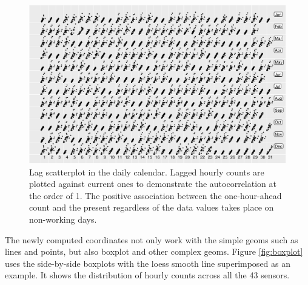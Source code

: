 \documentclass[article]{jss}
\begin{document}
\begin{CodeChunk}
\begin{figure}

{\centering \includegraphics[width=\textwidth]{figure/scatterplot-1} 

}

\caption[Lag scatterplot in the daily calendar]{Lag scatterplot in the daily calendar. Lagged hourly counts are plotted against current ones to demonstrate the autocorrelation at the order of 1. The positive association between the one-hour-ahead count and the present regardless of the data values takes place on non-working days.}\label{fig:scatterplot}
\end{figure}
\end{CodeChunk}

The newly computed coordinates not only work with the simple geoms such
as lines and points, but also boxplot and other complex geoms. Figure
\ref{fig:boxplot} uses the side-by-side boxplots with the loess smooth
line superimposed as an example. It shows the distribution of hourly
counts across all the 43 sensors.
\end{document}
